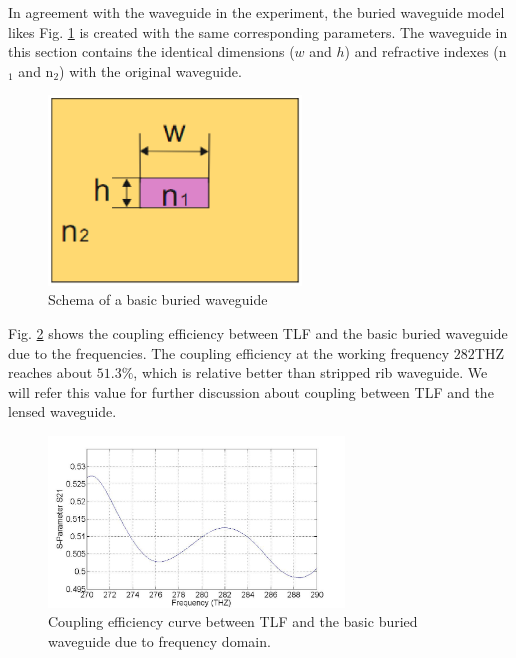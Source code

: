 In agreement with the waveguide in the experiment, the buried waveguide model likes Fig. \ref{fig:buried_waveguide} is created with the same corresponding parameters. The waveguide in this section contains the identical dimensions ($w$ and $h$) and refractive indexes (n$_{1}$ and n$_{2}$) with the original waveguide. 
\begin{figure}[!ht]
\centering
\includegraphics[width=0.6\textwidth]{bilder/buried_waveguide}
\caption{Schema of a basic buried waveguide}
\label{fig:buried_waveguide}
\end{figure}
Fig. \ref{fig:curve_coupling_basic_buried_waveguide} shows the coupling efficiency between TLF and the basic buried waveguide due to the frequencies. The coupling efficiency at the working frequency $282$THZ reaches about $51.3\%$, which is relative better than stripped rib waveguide. We will refer this value for further discussion about coupling between TLF and the lensed waveguide.  
\begin{figure}[!ht]
\centering
\includegraphics[width=0.7\textwidth]{bilder/s21_sym_waveguide}
\caption{Coupling efficiency curve between TLF and the basic buried waveguide due to frequency domain.}
\label{fig:curve_coupling_basic_buried_waveguide}
\end{figure}
